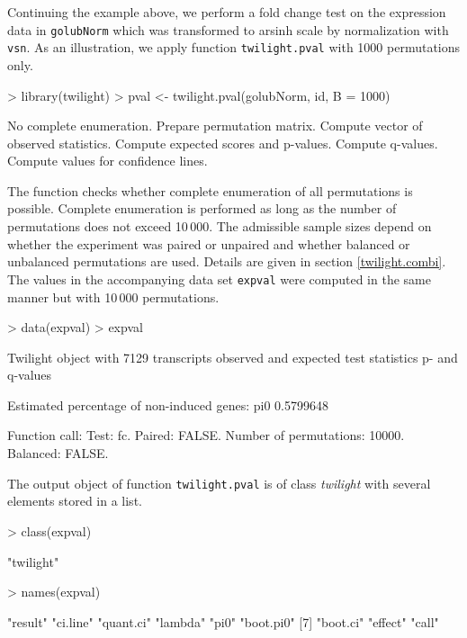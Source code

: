 \documentclass[11pt,a4paper,fleqn]{report}
\newcommand{\Robject}[1]{{\texttt{#1}}}
\newcommand{\Rfunction}[1]{{\texttt{#1}}}
\newcommand{\Rclass}[1]{{\textit{#1}}}
\begin{document}
Continuing the example above, we perform a fold change test on the expression data in \Robject{golubNorm} which was transformed to arsinh scale by normalization with \Rfunction{vsn}. As an illustration, we apply function \texttt{twilight.pval} with 1000 permutations only.
\begin{Schunk}
\begin{Sinput}
> library(twilight)
> pval <- twilight.pval(golubNorm, id, B = 1000)
\end{Sinput}
\begin{Soutput}
No complete enumeration. Prepare permutation matrix. 
Compute vector of observed statistics. 
Compute expected scores and p-values. 
Compute q-values. 
Compute values for confidence lines. 
\end{Soutput}
\end{Schunk}
The function checks whether complete enumeration of all permutations is possible. Complete enumeration is performed as long as the number of permutations does not exceed 10\,000. The admissible sample sizes depend on whether the experiment was paired or unpaired and whether balanced or unbalanced permutations are used. Details are given in section \ref{twilight.combi}.
The values in the accompanying data set \Robject{expval} were computed in the same manner but with 10\,000 permutations.
\begin{Schunk}
\begin{Sinput}
> data(expval)
> expval
\end{Sinput}
\begin{Soutput}
 Twilight object with
     7129 transcripts
     observed and expected test statistics
     p- and q-values

 Estimated percentage of non-induced genes:
      pi0 
0.5799648 

 Function call:
 Test: fc. Paired: FALSE. Number of permutations: 10000. Balanced: FALSE. 
\end{Soutput}
\end{Schunk}
The output object of function \Rfunction{twilight.pval} is of class \Rclass{twilight} with several elements stored in a list.
\begin{Schunk}
\begin{Sinput}
> class(expval)
\end{Sinput}
\begin{Soutput}
[1] "twilight"
\end{Soutput}
\begin{Sinput}
> names(expval)
\end{Sinput}
\begin{Soutput}
[1] "result"   "ci.line"  "quant.ci" "lambda"   "pi0"      "boot.pi0"
[7] "boot.ci"  "effect"   "call"    
\end{Soutput}
\end{Schunk}
\end{document}
